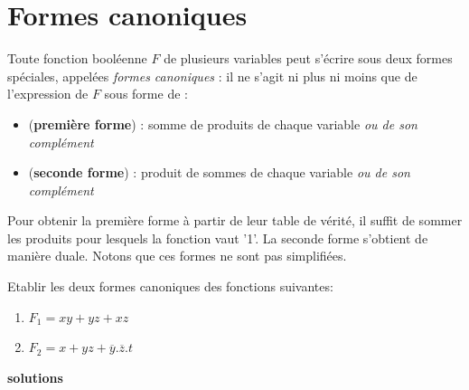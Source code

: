 \documentclass[a4paper,11pt]{article}
\begin{document}
\section{Formes canoniques}

Toute fonction booléenne $F$ de plusieurs variables peut s'écrire sous deux formes spéciales, appelées {\it formes canoniques} : il ne s'agit ni plus ni moins que de l'expression de $F$ sous forme de :
\begin{itemize}
\item ({\bf première forme}) : somme de produits de chaque variable {\it ou de son complément}
\item ({\bf seconde forme}) : produit de sommes de chaque variable {\it ou de son complément}
\end{itemize}

Pour obtenir la première forme à partir de leur table de vérité, il suffit de sommer les produits pour lesquels la fonction vaut '1'. La seconde forme s'obtient de manière duale. Notons que ces formes ne sont pas simplifiées.

Etablir les deux formes canoniques des fonctions suivantes:

\begin{enumerate}
\item $F_1=xy+yz+xz$
\item $F_2=x+yz+\overline{y}.\overline{z}.t$
\end{enumerate}

  {\bf solutions }
\end{document}

